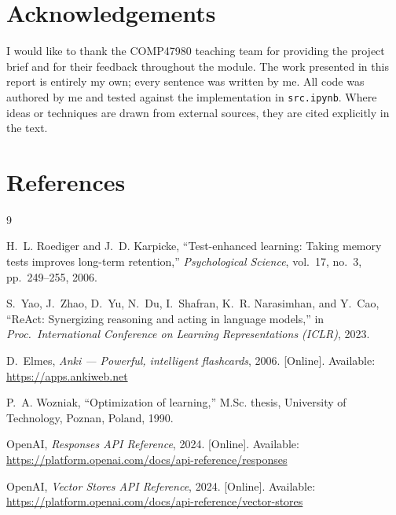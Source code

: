 \documentclass[12pt,a4paper]{article}
\begin{document}
\section*{Acknowledgements}

I would like to thank the COMP47980 teaching team for providing the project
brief and for their feedback throughout the module. The work presented in
this report is entirely my own; every sentence was written by me. All code
was authored by me and tested against the implementation in
\texttt{src.ipynb}. Where ideas or techniques are drawn from external
sources, they are cited explicitly in the text.

\section*{References}

\begin{thebibliography}{9}

H.~L. Roediger and J.~D. Karpicke,
``Test-enhanced learning: Taking memory tests improves long-term retention,''
\textit{Psychological Science}, vol.~17, no.~3, pp.~249--255, 2006.

S.~Yao, J.~Zhao, D.~Yu, N.~Du, I.~Shafran, K.~R. Narasimhan, and Y.~Cao,
``ReAct: Synergizing reasoning and acting in language models,''
in \textit{Proc.\ International Conference on Learning Representations (ICLR)},
2023.

D.~Elmes,
\textit{Anki --- Powerful, intelligent flashcards},
2006. [Online]. Available: \url{https://apps.ankiweb.net}

P.~A. Wozniak,
``Optimization of learning,''
M.Sc. thesis, University of Technology, Poznan, Poland, 1990.

OpenAI,
\textit{Responses API Reference},
2024. [Online]. Available:
\url{https://platform.openai.com/docs/api-reference/responses}

OpenAI,
\textit{Vector Stores API Reference},
2024. [Online]. Available:
\url{https://platform.openai.com/docs/api-reference/vector-stores}

\end{thebibliography}
\end{document}

